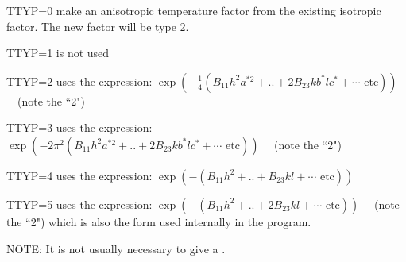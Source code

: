 \p
\begin{list} {} {\setlength{\labelwidth}{ 2 cm}
  \setlength{\parsep}{-1ex}
  \setlength{\leftmargin}{\labelwidth}
 \addtolength{\leftmargin}{1.5cm}}
\item[TTYP=0 \hfill] make an anisotropic temperature factor from the existing
            isotropic factor.  The new factor will be type 2.
\item[TTYP=1 \hfill] is not used
\item[TTYP=2 \hfill] uses the expression:
  \(\exp(-\frac{1}{4}(B_{11}h^2a^{*2} + . . + 2 B_{23} kb^* lc^* + \cdots \mbox{ etc}))\)
\ \          (note the ``2")
\item[TTYP=3 \hfill] uses the expression:
        \(\exp(-2 \pi ^2(B_{11} h^2a^{*2} + . . + 2 B_{23} kb^* lc^* + \cdots \mbox{ etc}))\)
\ \     (note the ``2")
\item[TTYP=4 \hfill] uses the expression:
       $ \exp(-(B_{11} h^2 + . . + B_{23} k l +  \cdots \mbox{ etc}))$
\item[TTYP=5 \hfill] uses the expression:
     $\exp(-(B_{11}  h^2 + . . + 2 B_{23} k l +  \cdots \mbox{ etc}))$ \ \ (note the ``2")
           which is also the form used internally in the program.
\end{list}\p
{}
\cardend\newpage
{}
\begin{list} {} {\setlength{\labelwidth}{ 2 cm}
  \setlength{\parsep}{-1ex}
  \setlength{\leftmargin}{\labelwidth}}\item[\bbold NOTE: \hfill] It is not usually necessary to give
 a .\end{list}
 
